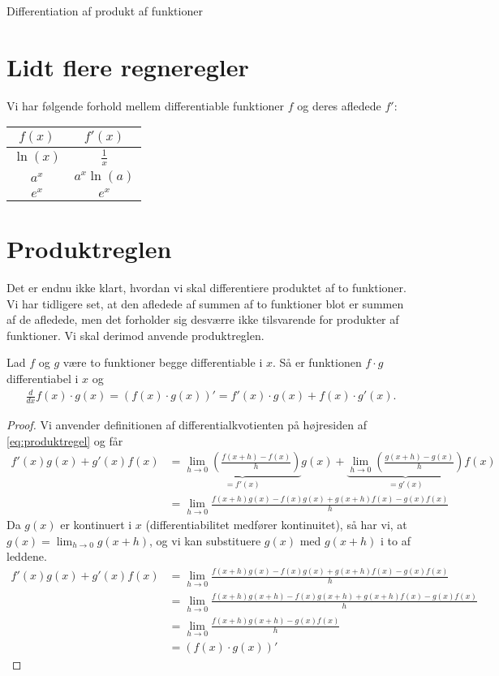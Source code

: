 \begin{center}
\Huge
Differentiation af produkt af funktioner
\end{center}

\section*{Lidt flere regneregler}
\begin{setn}
Vi har følgende forhold mellem differentiable funktioner $f$ og deres afledede $f'$:
\begin{center}
\begin{tabular}{c|c}
$f(x)$ & $f'(x)$\\
\hline
$\ln(x)$ & $\frac{1}{x}$\\
$a^x$ & $a^x\ln(a)$\\
$e^x$ & $e^x$\\
\end{tabular}
\end{center}
\end{setn}

\section*{Produktreglen}

Det er endnu ikke klart, hvordan vi skal differentiere produktet af to funktioner. Vi har tidligere set, at den afledede af summen af to funktioner blot er summen af de afledede, men det forholder sig desværre ikke tilsvarende for produkter af funktioner. Vi skal derimod anvende produktreglen.
\begin{setn}[Produktreglen]
Lad $f$ og $g$ være to funktioner begge differentiable i $x$. Så er funktionen $f\cdot g$ differentiabel i $x$ og 
\begin{align}\label{eq:produktregel}
\frac{d}{dx} f(x)\cdot g(x) = \left(f(x)\cdot g(x)\right)' = f'(x)\cdot g(x) + f(x)\cdot g'(x).
\end{align}
\end{setn}
\begin{proof}
Vi anvender definitionen af differentialkvotienten på højresiden af \eqref{eq:produktregel} og får
\begin{align*}
f'(x)g(x)+g'(x)f(x) &= \underbrace{\lim_{h\to 0}\left(\frac{f(x+h)-f(x)}{h}\right)}_{=f'(x)}g(x) + \underbrace{\lim_{h\to 0}\left(\frac{g(x+h)-g(x)}{h}\right)}_{=g'(x)}f(x)\\
&=\lim_{h\to 0} \frac{f(x+h)g(x)-f(x)g(x)+g(x+h)f(x)-g(x)f(x)}{h}
\end{align*}
Da $g(x)$ er kontinuert i $x$ (differentiabilitet medfører kontinuitet), så har vi, at $g(x) = \lim_{h\to 0}g(x+h)$, og vi kan substituere $g(x)$ med $g(x+h)$ i to af leddene.
\begin{align*}
f'(x)g(x)+g'(x)f(x) &=  \lim_{h\to 0} \frac{f(x+h)g(x)-f(x)g(x)+g(x+h)f(x)-g(x)f(x)}{h}\\
&=\lim_{h\to 0} \frac{f(x+h)g(x+h)-f(x)g(x+h)+g(x+h)f(x)-g(x)f(x)}{h}\\
&=\lim_{h\to 0} \frac{f(x+h)g(x+h) -g(x)f(x)}{h}\\
&= (f(x)\cdot g(x))'
\end{align*}
\end{proof}

